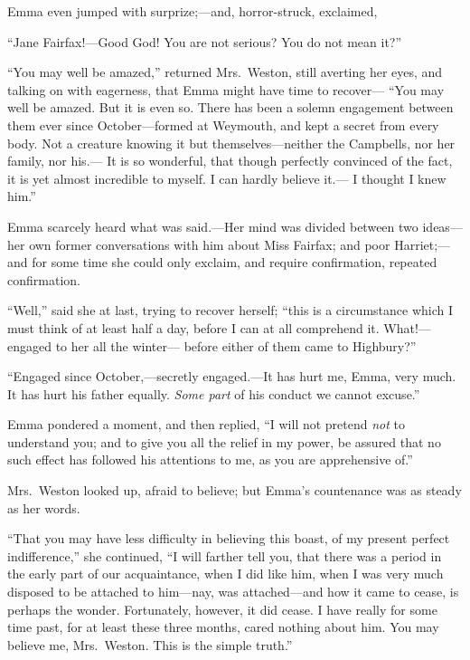 Emma even jumped with surprize;---and, horror-struck, exclaimed,

``Jane Fairfax!---Good God!  You are not serious?  You do not mean it?''

``You may well be amazed,'' returned Mrs.\ Weston, still averting her eyes,
and talking on with eagerness, that Emma might have time to recover---%
``You may well be amazed.  But it is even so.  There has been a solemn
engagement between them ever since October---formed at Weymouth,
and kept a secret from every body.  Not a creature knowing it
but themselves---neither the Campbells, nor her family, nor his.---%
It is so wonderful, that though perfectly convinced of the fact,
it is yet almost incredible to myself.  I can hardly believe it.---%
I thought I knew him.''

Emma scarcely heard what was said.---Her mind was divided between
two ideas---her own former conversations with him about Miss Fairfax;
and poor Harriet;---and for some time she could only exclaim,
and require confirmation, repeated confirmation.

``Well,'' said she at last, trying to recover herself; ``this is a
circumstance which I must think of at least half a day, before I
can at all comprehend it.  What!---engaged to her all the winter---%
before either of them came to Highbury?''

``Engaged since October,---secretly engaged.---It has hurt me,
Emma, very much.  It has hurt his father equally.  \emph{Some part}
of his conduct we cannot excuse.''

Emma pondered a moment, and then replied, ``I will not pretend
\emph{not} to understand you; and to give you all the relief in my power,
be assured that no such effect has followed his attentions to me,
as you are apprehensive of.''

Mrs.\ Weston looked up, afraid to believe; but Emma's countenance
was as steady as her words.

``That you may have less difficulty in believing this boast, of my
present perfect indifference,'' she continued, ``I will farther tell you,
that there was a period in the early part of our acquaintance,
when I did like him, when I was very much disposed to be
attached to him---nay, was attached---and how it came to cease,
is perhaps the wonder.  Fortunately, however, it did cease.
I have really for some time past, for at least these three months,
cared nothing about him.  You may believe me, Mrs.\ Weston.
This is the simple truth.''

